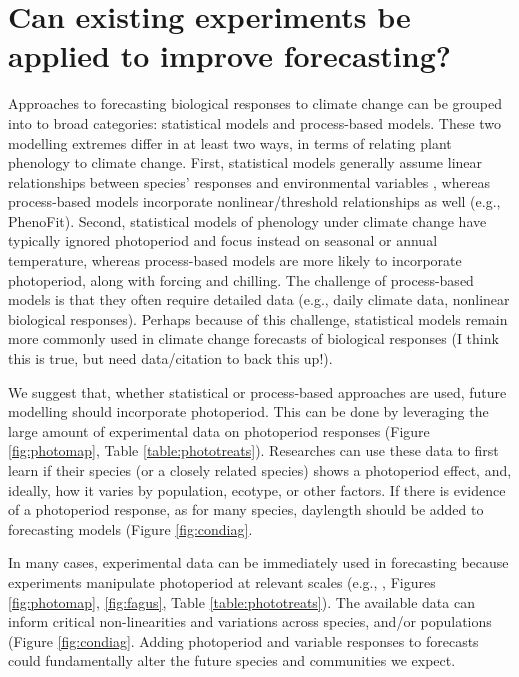 \documentclass{article}
\begin{document}
\section*{Can existing experiments be applied to improve forecasting?}
\par Approaches to forecasting biological responses to climate change can be grouped into to broad categories: statistical models and process-based models. %
These two modelling extremes differ in at least two ways, in terms of relating plant phenology to climate change. First, statistical models generally assume linear relationships between species' responses and environmental variables \citep[e.g.,][]{}, whereas process-based models incorporate nonlinear/threshold relationships as well (e.g., PhenoFit). Second, statistical models of phenology under climate change have typically ignored photoperiod and focus instead on seasonal or annual temperature,%
whereas process-based models are more likely to incorporate photoperiod, along with forcing and chilling. The challenge of process-based models is that they often require detailed data (e.g., daily climate data, nonlinear biological responses). Perhaps because of this challenge, statistical models remain more commonly used in climate change forecasts of biological responses (I think this is true, but need data/citation to back this up!). 
\par We suggest that, whether statistical or process-based approaches are used, future modelling should  incorporate photoperiod. This can be done by leveraging the large amount of experimental data on photoperiod responses (Figure \ref{fig:photomap}, Table \ref{table:phototreats}). Researches can use these data to first learn if their species (or a closely related species) shows a photoperiod effect, and, ideally, how it varies by population, ecotype, or other factors. If there is evidence of a photoperiod response, as for many species, daylength should be added to forecasting models (Figure \ref{fig:condiag}. 
\par In many cases, experimental data can be immediately used in forecasting because experiments manipulate photoperiod at relevant scales (e.g., \citet{Basler:2014aa,Heide:2015aa}, Figures \ref{fig:photomap}, \ref{fig:fagus}, Table \ref{table:phototreats}).  The available data can inform critical  non-linearities and variations across species, and/or populations (Figure \ref{fig:condiag}.  Adding photoperiod and variable responses to forecasts could fundamentally alter the future species and communities we expect. 
\end{document}
